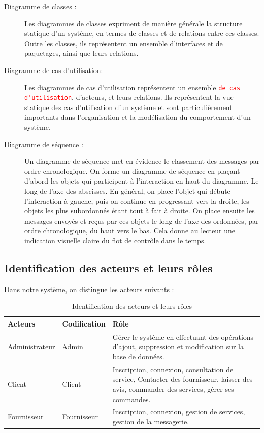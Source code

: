 \documentclass[french]{report}
\newcommand\rmq[1]{\textcolor{red}{\tt #1}}
\begin{document}
\begin{description}
    \item[Diagramme de classes :]
        Les diagrammes de classes expriment de manière générale la structure
        statique d'un système, en termes de classes et de relations entre ces
        classes. Outre les classes, ils représentent un ensemble d'interfaces
        et de paquetages, ainsi que leurs relations.\cite{UML3}

    \item[Diagramme de cas d'utilisation:]
        Les diagrammes de cas d'utilisation représentent un ensemble \rmq{de cas
        d'utilisation}, d'acteurs, et leurs relations. Ils représentent la vue
        statique des cas d'utilisation d'un système et sont particulièrement
        importants dans l'organisation et la modélisation du comportement d'un
        système. \cite{UML3}

    \item[Diagramme de séquence :]
        Un diagramme de séquence met en évidence le classement des messages par
        ordre chronologique. On forme un diagramme de séquence en plaçant
        d'abord les objets qui participent à l'interaction en haut du diagramme.
        Le long de l'axe des abscisses. En général, on place l'objet qui débute
        l'interaction à gauche, puis on continue en progressant vers la droite,
        les objets les plus subordonnés étant tout à fait à droite. On place
        ensuite les messages envoyés et reçus par ces objets le long de l'axe
        des ordonnées, par ordre chronologique, du haut vers le bas. Cela donne
        au lecteur une indication visuelle claire du flot de contrôle dans le
        temps. \cite{UML3}
\end{description}

\subsection{Identification des acteurs et leurs rôles }

Dans notre système, on distingue les acteurs suivants :

\begin{table}[h!]
    \centering
    \begin{tabular}{ |m{4cm}|m{4cm}|m{4cm}| }
    \hline
    \textbf{Acteurs} & \textbf{Codification} & \textbf{Rôle} \\
    \hline
    Administrateur & Admin & Gérer le système en effectuant des opérations
        d'ajout, suppression et modification sur la base de données.\\
    \hline
    Client & Client & Inscription, connexion,  consultation de service,
        Contacter des fournisseur, laisser des avis, commander des services,
        gérer ses commandes.\\
    \hline
    Fournisseur & Fournisseur & Inscription, connexion, gestion de services,
        gestion de la messagerie.\\
    \hline
    \end{tabular}
    \caption{Identification des acteurs et leurs rôles}
    \label{Tableaux:1}
\end{table}
\end{document}

